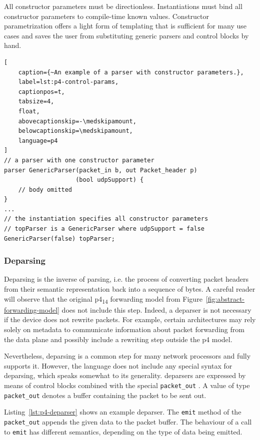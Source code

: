 All constructor parameters must be directionless. Instantiations must bind all
constructor parameters to compile-time known values. Constructor parametrization
offers a light form of templating that is sufficient for many use cases and
saves the user from substituting generic parsers and control blocks by hand.

\begin{lstlisting}[
	caption={~An example of a parser with constructor parameters.},
	label=lst:p4-control-params,
	captionpos=t,
	tabsize=4,
	float,
	abovecaptionskip=-\medskipamount,
	belowcaptionskip=\medskipamount,
	language=p4
]
// a parser with one constructor parameter
parser GenericParser(packet_in b, out Packet_header p)
                    (bool udpSupport) {
	// body omitted
}
...
// the instantiation specifies all constructor parameters
// topParser is a GenericParser where udpSupport = false
GenericParser(false) topParser;
\end{lstlisting}


\subsubsection*{Deparsing}

Deparsing is the inverse of parsing, i.e. the process of converting packet
headers from their semantic representation back into a sequence of bytes. A
careful reader will observe that the original \acrshort{p4}\textsubscript{14}
forwarding model from Figure~\ref{fig:abstract-forwarding-model} does not
include this step. Indeed, a deparser is not necessary if the device does not
rewrite packets. For example, certain architectures may rely solely on metadata
to communicate information about packet forwarding from the data plane and
possibly include a rewriting step outside the \acrshort{p4} model.

Nevertheless, deparsing is a common step for many network processors and \pfs
fully supports it. However, the language does not include any special syntax for
deparsing, which speaks somewhat to its generality. \pfs deparsers are expressed
by means of control blocks combined with the special \texttt{packet\_out}
\extern. A value of type \texttt{packet\_out} denotes a buffer containing the
packet to be sent out.

Listing~\ref{lst:p4-deparser} shows an example deparser. The \texttt{emit}
method of the \texttt{packet\_out} \extern{} appends the given data to the
packet buffer. The behaviour of a call to \texttt{emit} has different semantics,
depending on the type of data being emitted.

